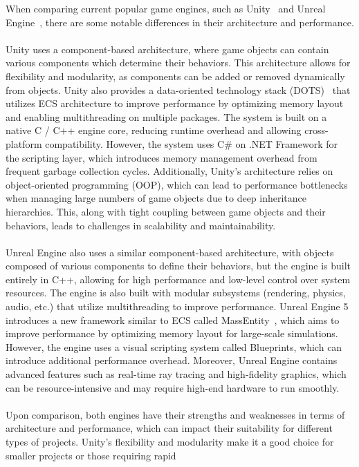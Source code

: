 When comparing current popular game engines, such as Unity~\cite{Unity_Engine} and Unreal Engine~\cite{Unreal_Engine}, 
there are some notable differences in their architecture and performance.
\\\\
Unity uses a component-based architecture, where game objects can contain various components which 
determine their behaviors.
This architecture allows for flexibility and modularity, as components can be added or removed dynamically 
from objects.
Unity also provides a data-oriented technology stack (DOTS)~\cite{Unity_DOTS} that utilizes
ECS architecture to improve performance by optimizing memory layout and enabling multithreading on 
multiple packages.
The system is built on a native C / C++ engine core, reducing runtime overhead and allowing
cross-platform compatibility.
However, the system uses C\# on .NET Framework for the scripting layer, which introduces memory management
overhead from frequent garbage collection cycles.
Additionally, Unity's architecture relies on object-oriented programming (OOP), which can lead to performance 
bottlenecks when managing large numbers of game objects due to deep inheritance hierarchies.
This, along with tight coupling between game objects and their behaviors, leads to challenges in scalability and maintainability.
\\\\
Unreal Engine also uses a similar component-based architecture, with objects composed of various components 
to define their behaviors, but the engine is built entirely in C++, allowing for high 
performance and low-level control over system resources.
The engine is also built with modular subsystems (rendering, physics, audio, etc.) that utilize multithreading 
to improve performance.
Unreal Engine 5 introduces a new framework similar to ECS called MassEntity~\cite{Unreal_MassEntity}, which aims to 
improve performance by optimizing memory layout for large-scale simulations.
However, the engine uses a visual scripting system called Blueprints, which can introduce additional
performance overhead.
Moreover, Unreal Engine contains advanced features such as real-time ray tracing and high-fidelity graphics, 
which can be resource-intensive and may require high-end hardware to run smoothly.
\\\\
Upon comparison, both engines have their strengths and weaknesses in terms of architecture and performance, 
which can impact their suitability for different types of projects.
Unity's flexibility and modularity make it a good choice for smaller projects or those requiring rapid 
